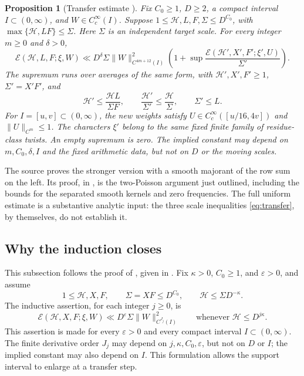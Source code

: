 \documentclass[11pt]{article}
\newcommand{\E}{\mathcal E}
\numberwithin{equation}{section}
\newtheorem{proposition}{Proposition}
\begin{document}
\begin{proposition}[Transfer estimate {\cite[Proposition~5.4]{original}}]\label{prop:guide-transfer}
Fix $C_0\ge1$, $D\ge2$, a compact interval $I\subset(0,\infty)$,
and $W\in C_c^\infty(I)$. Suppose
$1\le\mathcal H,L,F,\Sigma\le D^{C_0}$, with
$\max\{\mathcal H,LF\}\le\Sigma$. Here $\Sigma$ is an independent
target scale. For every integer $m\ge0$ and $\delta>0$,
\begin{equation}\label{eq:transferprop}
 \E(\mathcal H,L,F;\xi,W)
 \ll D^\delta\Sigma\|W\|_{C^{4m+12}(I)}^2
 \left(1+\sup\frac{\E(\mathcal H',X',F';\xi',U)}{\Sigma'}\right).
\end{equation}
The supremum runs over averages of the same form, with
$\mathcal H',X',F'\ge1$, $\Sigma'=X'F'$, and
\begin{equation}\label{eq:transfer}
 \mathcal H'\le\frac{\mathcal HL}{\Sigma F},\qquad
 \frac{\mathcal H'}{\Sigma'}\le\frac{\mathcal H}{\Sigma},\qquad
 \Sigma'\le L.
\end{equation}
For $I=[u,v]\subset(0,\infty)$, the new weights satisfy
$U\in C_c^\infty([u/16,4v])$ and $\|U\|_{C^m}\le1$.
The characters $\xi'$ belong to the same fixed finite family of
residue-class twists. An empty supremum is zero. The implied constant
may depend on $m,C_0,\delta,I$ and the fixed arithmetic data, but not
on $D$ or the moving scales.
\end{proposition}

The source proves the stronger version with a smooth majorant of the
row sum on the left. Its proof, in \cite[Section~7]{original}, is the two-Poisson argument just
outlined, including the bounds for the separated smooth kernels and
zero frequencies. The full uniform estimate is a substantive analytic
input: the three scale inequalities \eqref{eq:transfer}, by themselves,
do not establish it.

\subsection{Why the induction closes}
This subsection follows the proof of \cite[Proposition~5.1]{original}, given in
\cite[Section~5.5]{original}.
Fix $\kappa>0$, $C_0\ge1$, and $\varepsilon>0$, and assume
\begin{equation}\label{eq:standing}
 1\le\mathcal H,X,F,\qquad \Sigma=XF\le D^{C_0},\qquad
 \mathcal H\le\Sigma D^{-\kappa}.
\end{equation}
The inductive assertion, for each integer $j\ge0$, is
\begin{equation}\label{eq:inductive}
 \E(\mathcal H,X,F;\xi,W)
 \ll D^\varepsilon\Sigma\|W\|_{C^{J_j}(I)}^2
 \qquad\text{whenever }\mathcal H\le D^{j\kappa}.
\end{equation}
This assertion is made for every $\varepsilon>0$ and every compact
interval $I\subset(0,\infty)$. The finite derivative order $J_j$ may
depend on $j,\kappa,C_0,\varepsilon$, but not on $D$ or $I$; the implied
constant may also depend on $I$. This formulation allows the support
interval to enlarge at a transfer step.
\end{document}
